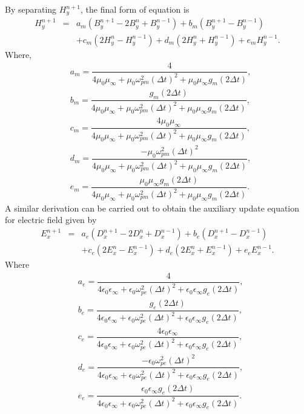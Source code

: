 By separating $H^{n+1}_y$, the final form of equation is
\begin{eqnarray}
\nonumber H^{n+1}_y &=& a_m\left(B^{n+1}_y-2B^n_y+B^{n-1}_y\right)+b_m\left(B^{n+1}_y-B^{n-1}_y\right)\\
&&+c_m\left(2H^n_y-H^{n-1}_y\right)+d_m\left(2H^n_y+H^{n-1}_y\right)+e_m H^{n-1}_y.
\label{2nd-order-B-H-final-form}
\end{eqnarray}
Where,
\begin{eqnarray}
\nonumber & a_m=\dfrac{4}{4\mu_0\mu_\infty+\mu_0\omega^2_{pm}\left(\Delta t\right)^2+\mu_0\mu_\infty g_m \left(2\Delta t\right)},\\
\nonumber & b_m=\dfrac{g_m\left(2\Delta t\right)}{4\mu_0\mu_\infty+\mu_0\omega^2_{pm}\left(\Delta t\right)^2+\mu_0\mu_\infty g_m \left(2\Delta t\right)},\\
\nonumber & c_m=\dfrac{4\mu_0\mu_\infty}{4\mu_0\mu_\infty+\mu_0\omega^2_{pm}\left(\Delta t\right)^2+\mu_0\mu_\infty g_m \left(2\Delta t\right)},\\
\nonumber & d_m=\dfrac{-\mu_0\omega^2_{pm}\left(\Delta t\right)^2}{4\mu_0\mu_\infty+\mu_0\omega^2_{pm}\left(\Delta t\right)^2+\mu_0\mu_\infty g_m \left(2\Delta t\right)},\\
\nonumber & e_m=\dfrac{\mu_0\mu_\infty g_m\left(2\Delta t\right)}{4\mu_0\mu_\infty+\mu_0\omega^2_{pm}\left(\Delta t\right)^2+\mu_0\mu_\infty g_m \left(2\Delta t\right)}.
\label{1D-Drude-H-scalars}
\end{eqnarray}
A similar derivation can be carried out to obtain the auxiliary update equation for electric field given by
\begin{eqnarray}
\nonumber E^{n+1}_x &=& a_e\left(D^{n+1}_x-2D^n_x+D^{n-1}_x\right)+b_e\left(D^{n+1}_x-D^{n-1}_x\right)\\
&&+c_e\left(2E^n_x-E^{n-1}_x\right)+d_e\left(2E^n_x+E^{n-1}_x\right)+e_e E^{n-1}_x.
\label{2nd-order-D-E-final-form}
\end{eqnarray}
Where
\begin{eqnarray}
\nonumber & a_e=\dfrac{4}{4\epsilon_0\epsilon_\infty+\epsilon_0\omega^2_{pe}\left(\Delta t\right)^2+\epsilon_0\epsilon_\infty g_e \left(2\Delta t\right)},\\
\nonumber & b_e=\dfrac{g_e\left(2\Delta t\right)}{4\epsilon_0\epsilon_\infty+\epsilon_0\omega^2_{pe}\left(\Delta t\right)^2+\epsilon_0\epsilon_\infty g_e \left(2\Delta t\right)},\\
\nonumber & c_e=\dfrac{4\epsilon_0\epsilon_\infty}{4\epsilon_0\epsilon_\infty+\epsilon_0\omega^2_{pe}\left(\Delta t\right)^2+\epsilon_0\epsilon_\infty g_e \left(2\Delta t\right)},\\
\nonumber & d_e=\dfrac{-\epsilon_0\omega^2_{pe}\left(\Delta t\right)^2}{4\epsilon_0\epsilon_\infty+\epsilon_0\omega^2_{pe}\left(\Delta t\right)^2+\epsilon_0\epsilon_\infty g_e \left(2\Delta t\right)},\\
\nonumber & e_e=\dfrac{\epsilon_0\epsilon_\infty g_e\left(2\Delta t\right)}{4\epsilon_0\epsilon_\infty+\epsilon_0\omega^2_{pe}\left(\Delta t\right)^2+\epsilon_0\epsilon_\infty g_e \left(2\Delta t\right)}.
\label{1D-Drude-E-scalars}
\end{eqnarray}
